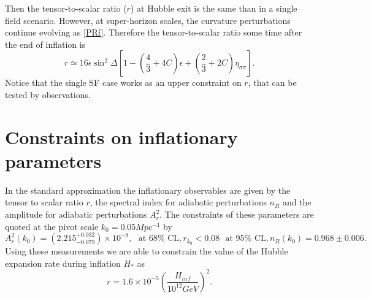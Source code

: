 \documentclass[amssymb,twocolumn,prd,nofootinbib,showpacs]{revtex4-1}
\begin{document}
Then the tensor-to-scalar ratio ($r$) at Hubble exit is the same than in a single field scenario. 
However, at super-horizon scales, the curvature perturbations continue evolving as \eqref{PRf}. 
Therefore the tensor-to-scalar ratio some time after the end of inflation is
%
\begin{equation}\label{Tensortoscalar}
r\simeq 16\epsilon \sin^2\Delta\left[1-\left(\frac{4}{3}+4C\right)\epsilon +\left(\frac{2}{3}+2C\right)\eta_{\sigma\sigma}\right].
\end{equation}
Notice that the single SF case works as an upper constraint on $r$, that can be tested by observations.

\section{Constraints on inflationary parameters}\label{experimentos}

In the standard approximation the inflationary observables are given by the tensor to scalar ratio $r$, 
the spectral index for adiabatic perturbations $n_R$ and the amplitude for adiabatic perturbations $A_r^2$.  
The constraints of these parameters are quoted at the pivot scale $k_0=0.05 Mpc^{-1}$ 
by \cite{const1,const2,planck,const3,const4,const5}
%
\begin{subequations}
\begin{equation}\label{amplitude}
A_r^2(k_0)=(2.215^{+0.032}_{-0.079})\times 10^{-9}, \ \ \ \text{at $68\%$ CL},
\end{equation}
\begin{equation}
r_{k_0}<0.08 \ \ \ \text{at $95\%$ CL},
\end{equation}
\begin{equation}\label{n_R}
n_R(k_0)=0.968 \pm 0.006.
\end{equation}
\end{subequations}
%
Using these measurements we are able to constrain the value of the Hubble expansion rate during 
inflation $H_*$ as \cite{H1,H2}
%
\begin{equation}\label{Hinf}
r = 1.6\times 10^{-5}\left(\frac{H_{inf}}{10^{12}GeV}\right)^2.
\end{equation}
\end{document}
